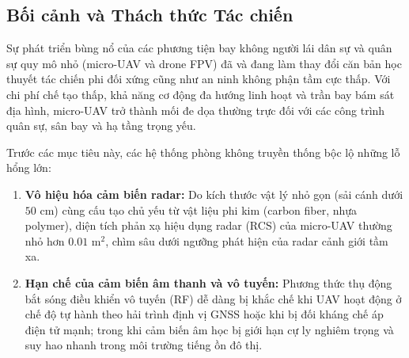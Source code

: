 \documentclass[11pt,a4paper]{article}
\begin{document}
\subsection{Bối cảnh và Thách thức Tác chiến}
Sự phát triển bùng nổ của các phương tiện bay không người lái dân sự và quân sự quy mô nhỏ (micro-UAV và drone FPV) đã và đang làm thay đổi căn bản học thuyết tác chiến phi đối xứng cũng như an ninh không phận tầm cực thấp. Với chi phí chế tạo thấp, khả năng cơ động đa hướng linh hoạt và trần bay bám sát địa hình, micro-UAV trở thành mối đe dọa thường trực đối với các công trình quân sự, sân bay và hạ tầng trọng yếu. 

Trước các mục tiêu này, các hệ thống phòng không truyền thống bộc lộ những lỗ hổng lớn:
\begin{enumerate}[label=(\roman*)]
    \item \textbf{Vô hiệu hóa cảm biến radar:} Do kích thước vật lý nhỏ gọn (sải cánh dưới $50\text{ cm}$) cùng cấu tạo chủ yếu từ vật liệu phi kim (carbon fiber, nhựa polymer), diện tích phản xạ hiệu dụng radar (RCS) của micro-UAV thường nhỏ hơn $0.01\text{ m}^2$, chìm sâu dưới ngưỡng phát hiện của radar cảnh giới tầm xa.
    \item \textbf{Hạn chế của cảm biến âm thanh và vô tuyến:} Phương thức thụ động bắt sóng điều khiển vô tuyến (RF) dễ dàng bị khắc chế khi UAV hoạt động ở chế độ tự hành theo hải trình định vị GNSS hoặc khi bị đối kháng chế áp điện tử mạnh; trong khi cảm biến âm học bị giới hạn cự ly nghiêm trọng và suy hao nhanh trong môi trường tiếng ồn đô thị.
\end{enumerate}
\end{document}
